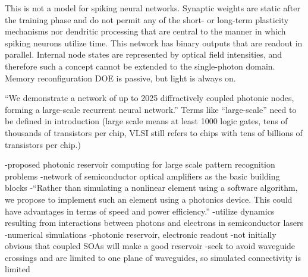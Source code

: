 This is not a model for spiking neural networks. Synaptic weights are static after the training phase and do not permit any of the short- or long-term plasticity mechanisms nor dendritic processing that are central to the manner in which spiking neurons utilize time. This network has binary outputs that are readout in parallel. Internal node states are represented by optical field intensities, and therefore such a concept cannot be extended to the single-photon domain. Memory reconfiguration DOE is passive, but light is always on.

``We demonstrate a network of up to 2025 diffractively coupled photonic nodes, forming a large-scale recurrent neural network.'' Terms like ``large-scale'' need to be defined in introduction (large scale means at least 1000 logic gates, tens of thousands of transistors per chip, VLSI still refers to chips with tens of billions of transistors per chip.)

\vspace{3em}
\cite{vabr2017}



\vspace{3em}
\cite{padu2012}

\vspace{3em}
\cite{dusc2012}


\vspace{3em}

\cite{vadi2008}
-proposed photonic reservoir computing for large scale pattern recognition problems
-network of semiconductor optical amplifiers as the basic building blocks
-``Rather than simulating a nonlinear element using a software algorithm, we propose to implement such an element using a photonics device. This could have advantages in terms of speed and power efficiency.''
-utilize dynamics resulting from interactions between photons and electrons in semiconductor lasers
-numerical simulations
-photonic reservoir, electronic readout
-not initially obvious that coupled SOAs will make a good reservoir
-seek to avoid waveguide crossings and are limited to one plane of waveguides, so simulated connectivity is limited

